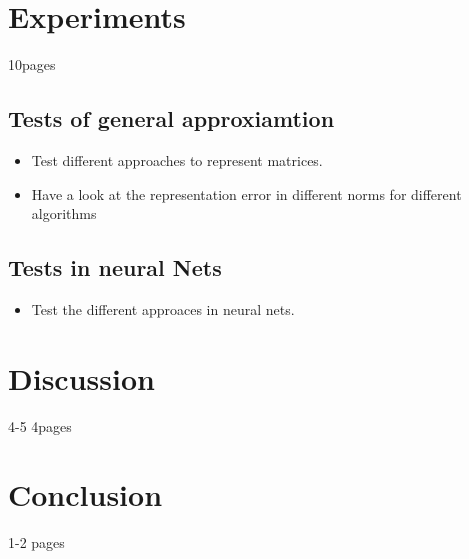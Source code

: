 \documentclass[doctype=mastersthesis,BCOR=15mm,biblatex]{ldvbook}%
\begin{document}
\chapter{Experiments}
10pages

\section{Tests of general approxiamtion}
\begin{itemize}
\item Test different approaches to represent matrices.
\item Have a look at the representation error in different norms for different algorithms
\end{itemize}
\section{Tests in neural Nets}
\begin{itemize}
\item Test the different approaces in neural nets.
\end{itemize}
\chapter{Discussion}
4-5 4pages

\chapter{Conclusion}
1-2 pages







\printbibliography{}
\end{document}
